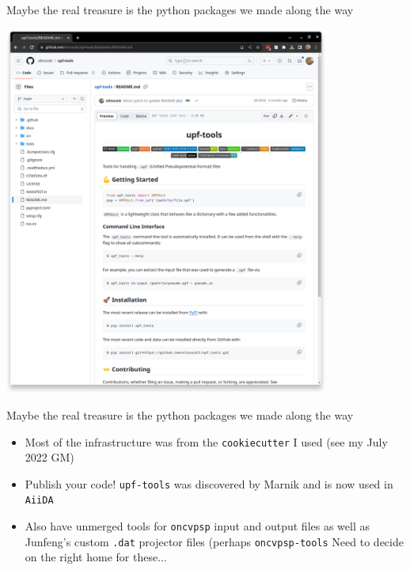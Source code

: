 \documentclass[xcolor=table,aspectratio=169]{beamer}
\numberwithin{equation}{section}
\begin{document}
\begin{frame}{\footnotesize Maybe the real treasure is the python packages we made along the way}

    \includegraphics[width=0.8\textwidth]{figures/upf_tools.png}

\end{frame}

\begin{frame}{\footnotesize Maybe the real treasure is the python packages we made along the way}

    \begin{itemize}
        \item Most of the infrastructure was from the \texttt{cookiecutter} I used (see my July 2022 GM)
        \item Publish your code! \texttt{upf-tools} was discovered by Marnik and is now used in \texttt{AiiDA}
        \item Also have unmerged tools for \texttt{oncvpsp} input and output files as well as Junfeng's custom \texttt{.dat} projector files (perhaps \texttt{oncvpsp-tools} Need to decide on the right home for these...
    \end{itemize}
    
\end{frame}
\end{document}

